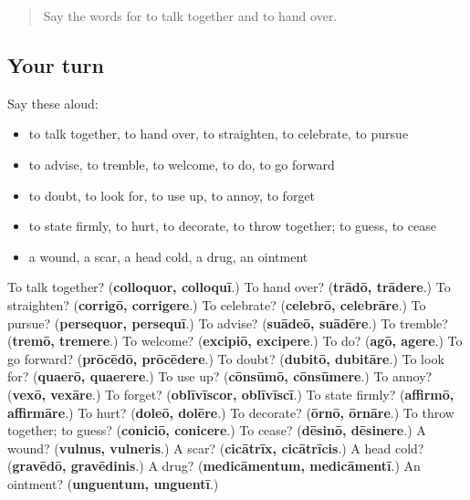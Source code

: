 \label{lesson:LA-R205-second-pass-words-from-chapters-201-205}



\begin{quote}
Say the words for to talk together and to hand over.
\end{quote}

\subsection*{Your turn}
Say these aloud:

\begin{itemize}
\raggedright
  \item to talk together, to hand over, to straighten, to celebrate, to pursue
  \item to advise, to tremble, to welcome, to do, to go forward
  \item to doubt, to look for, to use up, to annoy, to forget
  \item to state firmly, to hurt, to decorate, to throw together; to guess, to cease
  \item a wound, a scar, a head cold, a drug, an ointment
\end{itemize}

\begin{tcolorbox}[breakable,colback=teal!4,colframe=teal!35!black,title={Before you move on}]
To talk together? (\textbf{colloquor, colloquī}.) To hand over? (\textbf{trādō, trādere}.) To straighten? (\textbf{corrigō, corrigere}.) To celebrate? (\textbf{celebrō, celebrāre}.) To pursue? (\textbf{persequor, persequī}.) To advise? (\textbf{suādeō, suādēre}.) To tremble? (\textbf{tremō, tremere}.) To welcome? (\textbf{excipiō, excipere}.) To do? (\textbf{agō, agere}.) To go forward? (\textbf{prōcēdō, prōcēdere}.) To doubt? (\textbf{dubitō, dubitāre}.) To look for? (\textbf{quaerō, quaerere}.) To use up? (\textbf{cōnsūmō, cōnsūmere}.) To annoy? (\textbf{vexō, vexāre}.) To forget? (\textbf{oblīvīscor, oblīvīscī}.) To state firmly? (\textbf{affirmō, affirmāre}.) To hurt? (\textbf{doleō, dolēre}.) To decorate? (\textbf{ōrnō, ōrnāre}.) To throw together; to guess? (\textbf{coniciō, conicere}.) To cease? (\textbf{dēsinō, dēsinere}.) A wound? (\textbf{vulnus, vulneris}.) A scar? (\textbf{cicātrīx, cicātrīcis}.) A head cold? (\textbf{gravēdō, gravēdinis}.) A drug? (\textbf{medicāmentum, medicāmentī}.) An ointment? (\textbf{unguentum, unguentī}.)
\end{tcolorbox}
